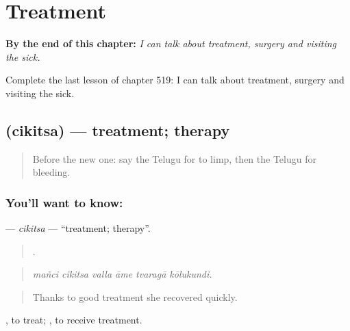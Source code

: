 
\chapter{Treatment}
\label{ch:te-treatment}

\begin{chapteropening}
\textbf{By the end of this chapter:} \emph{I can talk about treatment, surgery and visiting the sick.}

Complete the last lesson of chapter 519: I can talk about treatment, surgery and visiting the sick.
\end{chapteropening}

\section[\texorpdfstring{\te{చికిత్స} (cikitsa)}{చికిత్స (cikitsa)}]{ (cikitsa) — treatment; therapy}

\label{lesson:TE-C519-cikitsa}



\begin{quote}
Before the new one: say the Telugu for to limp, then the Telugu for bleeding.
\end{quote}

\subsection*{You'll want to know: }
\textbf{} — \emph{cikitsa} — \textquotedblleft{}treatment; therapy\textquotedblright{}.

\begin{quote}
     .
\end{quote}

\begin{quote}
\emph{mañci cikitsa valla āme tvaragā kōlukundi.}
\end{quote}

\begin{quote}
Thanks to good treatment she recovered quickly.
\end{quote}

 , to treat;  , to receive treatment.

